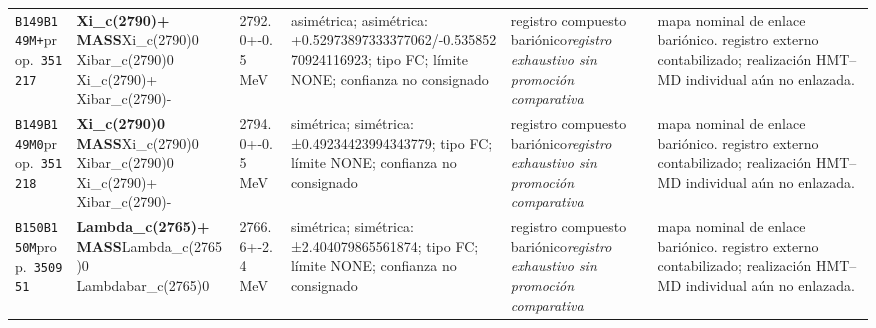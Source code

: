 \begin{landscape}
\begin{longtable}{L{1.85cm}L{4.45cm}L{2.35cm}L{4.05cm}L{3.35cm}L{7.15cm}}
\texttt{B149}\newline \texttt{B149M+}\newline prop.\ \texttt{351217} & \textbf{Xi\_\allowbreak{}c(2790)+ MASS}\newline Xi\_\allowbreak{}c(2790)0 \textbar{}\allowbreak{} Xibar\_\allowbreak{}c(2790)0 \textbar{}\allowbreak{} Xi\_\allowbreak{}c(2790)+ \textbar{}\allowbreak{} Xibar\_\allowbreak{}c(2790)- & 2792.0+-0.5\,MeV & asimétrica; asimétrica: +0.52973897333377062/-0.53585270924116923; tipo FC; límite NONE; confianza no consignado & registro compuesto bariónico\newline \emph{registro exhaustivo sin promoción comparativa} & mapa nominal de enlace bariónico. registro externo contabilizado; realización HMT--MD individual aún no enlazada. \\
\texttt{B149}\newline \texttt{B149M0}\newline prop.\ \texttt{351218} & \textbf{Xi\_\allowbreak{}c(2790)0 MASS}\newline Xi\_\allowbreak{}c(2790)0 \textbar{}\allowbreak{} Xibar\_\allowbreak{}c(2790)0 \textbar{}\allowbreak{} Xi\_\allowbreak{}c(2790)+ \textbar{}\allowbreak{} Xibar\_\allowbreak{}c(2790)- & 2794.0+-0.5\,MeV & simétrica; simétrica: ±0.49234423994343779; tipo FC; límite NONE; confianza no consignado & registro compuesto bariónico\newline \emph{registro exhaustivo sin promoción comparativa} & mapa nominal de enlace bariónico. registro externo contabilizado; realización HMT--MD individual aún no enlazada. \\
\texttt{B150}\newline \texttt{B150M}\newline prop.\ \texttt{350951} & \textbf{Lambda\_\allowbreak{}c(2765)+ MASS}\newline Lambda\_\allowbreak{}c(2765)0 \textbar{}\allowbreak{} Lambdabar\_\allowbreak{}c(2765)0 & 2766.6+-2.4\,MeV & simétrica; simétrica: ±2.404079865561874; tipo FC; límite NONE; confianza no consignado & registro compuesto bariónico\newline \emph{registro exhaustivo sin promoción comparativa} & mapa nominal de enlace bariónico. registro externo contabilizado; realización HMT--MD individual aún no enlazada. \\

\end{longtable}
\end{landscape}
